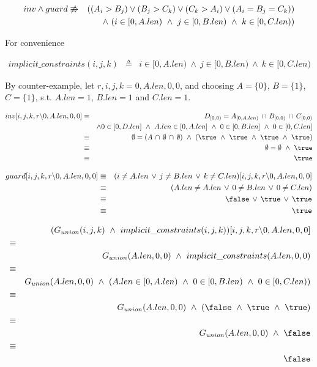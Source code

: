 \documentclass[a4paper]{article}
\newcommand{\DOGUARD}[3]{({#1} \neq A.len\, \lor\, {#2} \neq B.len\, \lor\, {#3} \neq C.len)}
\newcommand{\INTERSECTION}[4]{D_{[0, {#1})} = A_{[0, {#2})}\, \cap\, B_{[0, {#3})}\, \cap\, C_{[0, {#4})}}
\newcommand{\BOUNDED}[4]{{#1} \in [0, D.len] ~\land~ {#2} \in [0, A.len] ~\land~ {#3} \in [0, B.len] ~\land~ {#4} \in [0, C.len]}
\newcommand{\BOUNDEDNONINCLUSIVE}[3]{{#1} \in [0, A.len) ~\land~ {#2} \in [0, B.len) ~\land~ {#3} \in [0, C.len)}
\newcommand{\IFGUARD}{(A_i > B_j) \lor (B_j > C_k) \lor (C_k > A_i) \lor (A_i = B_j = C_k)}
\newcommand{\SUBSTITUTION}{[i, j, k, r \backslash 0, A.len, 0, 0]}
\begin{document}
\begin{eqnarray*}
inv \land guard  & \not\entails & (\IFGUARD)\\
    && \land~ (\BOUNDEDNONINCLUSIVE{i}{j}{k})
\end{eqnarray*}

For convenience

\begin{eqnarray*}
implicit\_constraints(i, j, k) & \triangleq & \BOUNDEDNONINCLUSIVE{i}{j}{k}
\end{eqnarray*}


By counter-example, let $r, i, j, k = 0, A.len, 0, 0$, and choosing $A = \{0\}$, $B = \{1\}$, $C = \{1\}$, s.t. $A.len = 1$, $B.len = 1$ and $C.len = 1$.

\begin{eqnarray*}
inv\SUBSTITUTION & \equiv & \INTERSECTION{0}{A.len}{0}{0}\\
    && \land \BOUNDED{0}{A.len}{0}{0}\\
    & \equiv & \emptyset = (A\, \cap\, \emptyset\, \cap\, \emptyset) ~\land~ (\true ~\land~ \true ~\land~ \true ~\land~ \true)\\
    & \equiv & \emptyset = \emptyset ~\land~ \true\\
    & \equiv & \true
\end{eqnarray*} 

\begin{eqnarray*}
guard\SUBSTITUTION & \equiv & \DOGUARD{i}{j}{k}\SUBSTITUTION\\
    & \equiv & \DOGUARD{A.len}{0}{0}\\
    & \equiv & \false\, \lor\, \true\, \lor\, \true\\
    & \equiv & \true
\end{eqnarray*} 

\begin{eqnarray*}
&& (G_{union}(i, j, k) ~\land~ implicit\_constraints(i, j, k))\SUBSTITUTION\\
& \equiv &\\
&& G_{union}(A.len, 0, 0) ~\land~ implicit\_constraints(A.len, 0, 0)\\
& \equiv &\\
&& G_{union}(A.len, 0, 0) ~\land~ (\BOUNDEDNONINCLUSIVE{A.len}{0}{0})\\
& \equiv &\\
&& G_{union}(A.len, 0, 0) ~\land~ (\false ~\land~ \true ~\land~ \true)\\
& \equiv &\\
&& G_{union}(A.len, 0, 0) ~\land~ \false\\
& \equiv &\\
&& \false
\end{eqnarray*}
\end{document}
